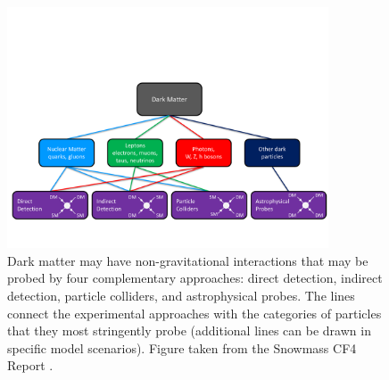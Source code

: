 \begin{figure}[t]
\centering
\includegraphics[width=0.85\textwidth]{figures/interactions.pdf}
\caption{
\label{fig:interactions}
Dark matter may have non-gravitational interactions that may be probed by four complementary approaches: 
direct detection, indirect detection, particle colliders, and astrophysical probes.
The lines connect the experimental approaches with the categories of particles that they most stringently probe (additional lines can be drawn in specific model scenarios). 
Figure taken from the Snowmass CF4 Report \citep{1305.1605}.
}
\end{figure}

